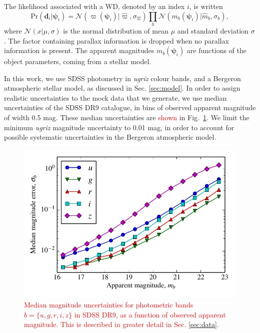 \documentclass[fleqn,usenatbib]{mnras}
\newcommand{\changes}[1]{\textcolor{red}{#1}}
\newcommand{\objp}{\boldsymbol{\psi}}
\newcommand{\data}{\mathbf{d}}
\newcommand{\pr}{\text{Pr}}
\begin{document}
The likelihood associated with a WD, denoted by an index $i$, is written
\begin{equation}\label{eq:likelihood}
	\pr(\data_i | \objp_i) = \mathcal{N}(\varpi(\objp_i)|\hat{\varpi},\sigma_{\hat{\varpi}})\prod_{b} \mathcal{N}(m_b(\objp_i)|\hat{m}_b,\sigma_b),
\end{equation}
where $\mathcal{N}(x | \mu,\sigma)$ is the normal distribution of mean $\mu$ and standard deviation $\sigma$. The factor containing parallax information is dropped when no parallax information is present. The apparent magnitudes $m_b(\objp_i)$ are functions of the object parameters, coming from a stellar model.

In this work, we use SDSS photometry in \emph{ugriz} colour bands, and a Bergeron atmospheric stellar model, as discussed in Sec. \ref{sec:model}. In order to assign realistic uncertainties to the mock data that we generate, we use median uncertainties of the SDSS DR9 catalogue, in bins of observed apparent magnitude of width 0.5 mag. These median uncertainties are \changes{shown} in Fig.~\ref{fig:magnitude_error}. We limit the minimum \emph{ugriz} magnitude uncertainty to 0.01 mag, in order to account for possible systematic uncertainties in the Bergeron atmospheric model.

\begin{figure}
	\includegraphics[width=\columnwidth]{median_app_errors.pdf}
    \caption{\changes{Median magnitude uncertainties for photometric bands $b=\{u,g,r,i,z\}$ in SDSS DR9, as a function of observed apparent magnitude. This is described in greater detail in Sec. \ref{sec:data}.}}
    \label{fig:magnitude_error}
\end{figure}
\end{document}
